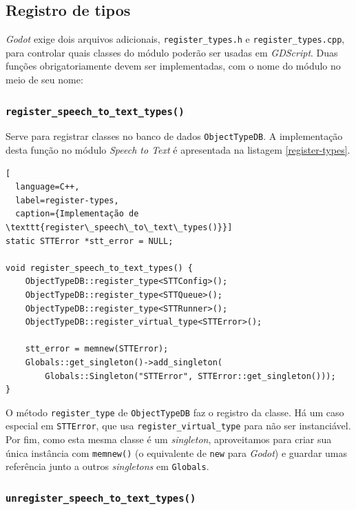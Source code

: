 
\subsection{Registro de tipos}

\textit{Godot} exige dois arquivos adicionais, \texttt{register\_types.h} e \texttt{register\_types.cpp}, para controlar quais classes do módulo poderão ser usadas em \textit{GDScript}. Duas funções obrigatoriamente devem ser implementadas, com o nome do módulo no meio de seu nome:

\subsubsection{\texttt{register\_speech\_to\_text\_types()}}

Serve para registrar classes no banco de dados \texttt{ObjectTypeDB}. A implementação desta função no módulo \textit{Speech to Text} é apresentada na listagem \ref{register-types}.

\begin{lstlisting}[
  language=C++,
  label=register-types,
  caption={Implementação de \texttt{register\_speech\_to\_text\_types()}}]
static STTError *stt_error = NULL;

void register_speech_to_text_types() {
    ObjectTypeDB::register_type<STTConfig>();
    ObjectTypeDB::register_type<STTQueue>();
    ObjectTypeDB::register_type<STTRunner>();
    ObjectTypeDB::register_virtual_type<STTError>();

    stt_error = memnew(STTError);
    Globals::get_singleton()->add_singleton(
        Globals::Singleton("STTError", STTError::get_singleton()));
}
\end{lstlisting}

O método \texttt{register\_type} de \texttt{ObjectTypeDB} faz o registro da classe. Há um caso especial em \texttt{STTError}, que usa \texttt{register\_virtual\_type} para não ser instanciável. Por fim, como esta mesma classe é um \textit{singleton}, aproveitamos para criar sua única instância com \texttt{memnew()} (o equivalente de \texttt{new} para \textit{Godot}) e guardar umas referência junto a outros \textit{singletons} em \texttt{Globals}.

\subsubsection{\texttt{unregister\_speech\_to\_text\_types()}}

